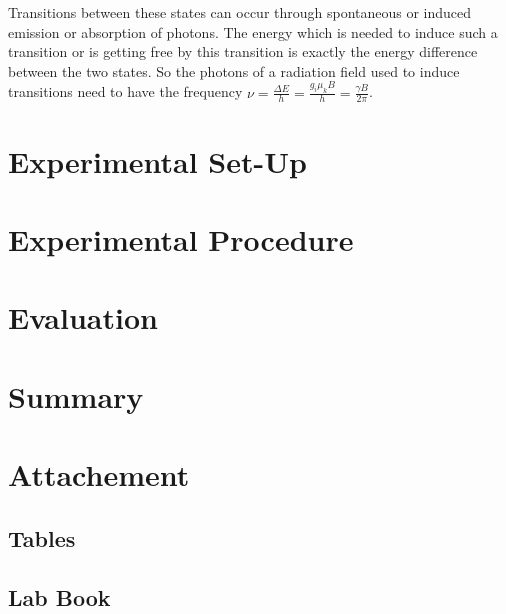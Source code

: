 \documentclass[12pt]{article}
\begin{document}
Transitions between these states can occur through spontaneous or induced emission or absorption of photons. The energy which is needed to induce such a transition or is getting free by this transition is exactly the energy difference between the two states. So the photons of a radiation field used to induce transitions need to have the frequency $\nu=\frac{\Delta E}{h}=\frac{g_i\mu_kB}{h}=\frac{\gamma B}{2\pi}$. 


\newpage
\section{Experimental Set-Up}


\newpage
\section{Experimental Procedure}



\newpage
\section{Evaluation}


\newpage
\section{Summary}


\newpage
\section{Attachement}

\subsection{Tables}

%


%

\newpage
\subsection{Lab Book}
\end{document}
